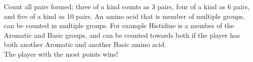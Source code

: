 \documentclass[a4paper,11pt,oneside]{memoir}
\begin{document}
Count all pairs formed; three of a kind counts as 3 pairs, four of a kind as 6 pairs, and five of a kind as 10 pairs.  
An amino acid that is member of multiple groups, can be counted in multiple groups.  
For example Histidine is a member of the Aromatic and Basic groups, and can be counted towards both if the player has both another Aromatic and another Basic amino acid.\\





The player with the most points wins!

\label{groups}


\setlength{\tabcolsep}{3pt}
\end{document}
